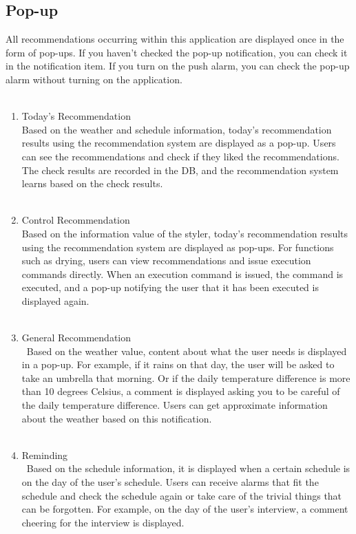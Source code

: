 \documentclass[conference]{IEEEtran}
\begin{document}
\subsection{Pop-up}
All recommendations occurring within this application are displayed once in the form of pop-ups. If you haven't checked the pop-up notification, you can check it in the notification item. If you turn on the push alarm, you can check the pop-up alarm without turning on the application. \\ \\
\begin{enumerate}
    \item Today's Recommendation\\
        Based on the weather and schedule information, today's recommendation results using the recommendation system are displayed as a pop-up. Users can see the recommendations and check if they liked the recommendations. The check results are recorded in the DB, and the recommendation system learns based on the check results. \\ \\
    \item Control Recommendation\\
        Based on the information value of the styler, today's recommendation results using the recommendation system are displayed as pop-ups. For functions such as drying, users can view recommendations and issue execution commands directly. When an execution command is issued, the command is executed, and a pop-up notifying the user that it has been executed is displayed again. \\ \\
    \item General Recommendation\\\
        Based on the weather value, content about what the user needs is displayed in a pop-up. For example, if it rains on that day, the user will be asked to take an umbrella that morning. Or if the daily temperature difference is more than 10 degrees Celsius, a comment is displayed asking you to be careful of the daily temperature difference. Users can get approximate information about the weather based on this notification. \\ \\
    \item Reminding\\\
        Based on the schedule information, it is displayed when a certain schedule is on the day of the user's schedule. Users can receive alarms that fit the schedule and check the schedule again or take care of the trivial things that can be forgotten. For example, on the day of the user's interview, a comment cheering for the interview is displayed. \\ \\
\end{enumerate}
\end{document}
